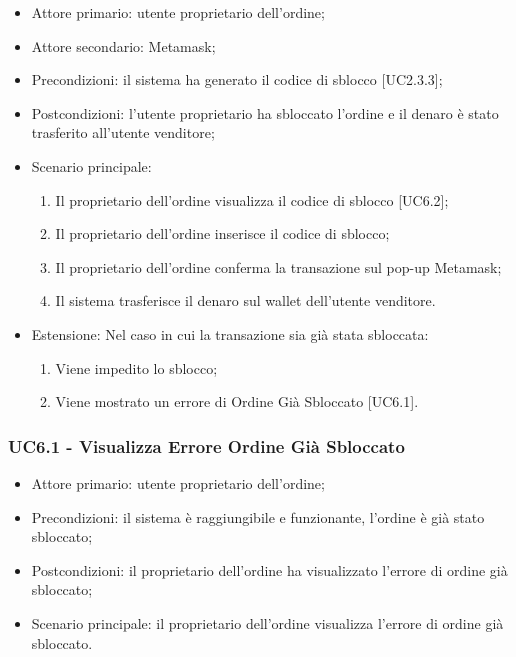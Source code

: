 \begin{itemize}
    \item Attore primario: utente proprietario dell'ordine;
    \item Attore secondario: Metamask\glo{};
    \item Precondizioni: il sistema ha generato il codice di sblocco [UC2.3.3];
    \item Postcondizioni: l'utente proprietario ha sbloccato l'ordine e il denaro è stato trasferito all'utente venditore;
    \item Scenario principale:
        \begin{enumerate}
            \item Il proprietario dell'ordine visualizza il codice di sblocco [UC6.2];
            \item Il proprietario dell'ordine inserisce il codice di sblocco;
            \item Il proprietario dell'ordine conferma la transazione sul pop-up Metamask\glo{};
            \item Il sistema trasferisce il denaro sul wallet\glo{} dell'utente venditore.
        \end{enumerate}
    \item Estensione: Nel caso in cui la transazione sia già stata sbloccata:
        \begin{enumerate}
            \item Viene impedito lo sblocco;
            \item Viene mostrato un errore di Ordine Già Sbloccato [UC6.1].
        \end{enumerate}
\end{itemize}

\subsubsection{UC6.1 - Visualizza Errore Ordine Già Sbloccato}

\begin{itemize}
    \item Attore primario: utente proprietario dell'ordine;
    \item Precondizioni: il sistema è raggiungibile e funzionante, l'ordine è già stato sbloccato;
    \item Postcondizioni: il proprietario dell'ordine ha visualizzato l'errore di ordine già sbloccato;
    \item Scenario principale: il proprietario dell'ordine visualizza l'errore di ordine già sbloccato.
\end{itemize}

